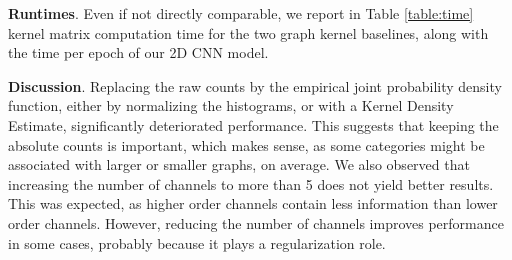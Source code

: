 \documentclass[runningheads]{llncs}
\begin{document}
\noindent \textbf{Runtimes}.
Even if not directly comparable, we report in Table \ref{table:time} kernel matrix computation time for the two graph kernel baselines, along with the time per epoch of our 2D CNN model.

\vspace{-0.45cm}

\begin{table*}[!h]
\begin{center}
\end{center}
\captionsetup{justification=centering, size=small}
\caption{Runtimes in seconds, rounded to the nearest integer. without using node attributes}
\label{table:time}
\end{table*}

\vspace{-1cm}

\noindent \textbf{Discussion}. Replacing the raw counts by the empirical joint probability density function, either by normalizing the histograms, or with a Kernel Density Estimate, significantly deteriorated performance. This suggests that keeping the absolute counts is important, which makes sense, as some categories might be associated with larger or smaller graphs, on average. We also observed that increasing the number of channels to more than 5 does not yield better results. This was expected, as higher order channels contain less information than lower order channels. However, reducing the number of channels improves performance in some cases, probably because it plays a regularization role.
\end{document}

